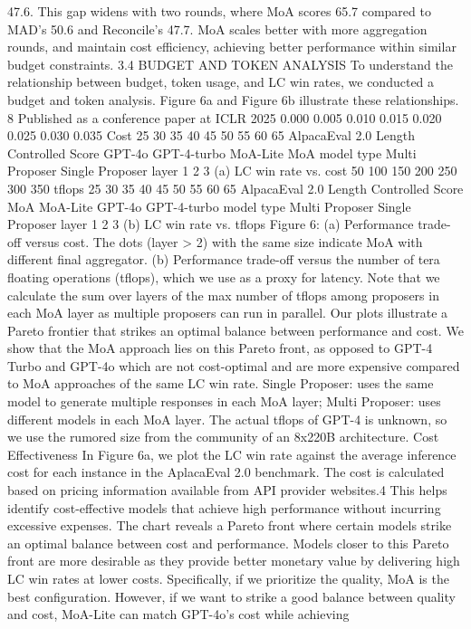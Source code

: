47.6. This gap widens with two rounds, where MoA scores 65.7 compared to MAD’s 50.6 and
Reconcile’s 47.7. MoA scales better with more aggregation rounds, and maintain cost efficiency,
achieving better performance within similar budget constraints.
3.4
BUDGET AND TOKEN ANALYSIS
To understand the relationship between budget, token usage, and LC win rates, we conducted a budget
and token analysis. Figure 6a and Figure 6b illustrate these relationships.
8
Published as a conference paper at ICLR 2025
0.000
0.005
0.010
0.015
0.020
0.025
0.030
0.035
Cost
25
30
35
40
45
50
55
60
65
AlpacaEval 2.0 Length Controlled Score
GPT-4o
GPT-4-turbo
MoA-Lite
MoA
model type
Multi Proposer
Single Proposer
layer
1
2
3
(a) LC win rate vs. cost
50
100
150
200
250
300
350
tflops
25
30
35
40
45
50
55
60
65
AlpacaEval 2.0 Length Controlled Score
MoA
MoA-Lite
GPT-4o
GPT-4-turbo
model type
Multi Proposer
Single Proposer
layer
1
2
3
(b) LC win rate vs. tflops
Figure 6: (a) Performance trade-off versus cost. The dots (layer > 2) with the same size indicate
MoA with different final aggregator. (b) Performance trade-off versus the number of tera floating
operations (tflops), which we use as a proxy for latency. Note that we calculate the sum over layers
of the max number of tflops among proposers in each MoA layer as multiple proposers can run in
parallel. Our plots illustrate a Pareto frontier that strikes an optimal balance between performance
and cost. We show that the MoA approach lies on this Pareto front, as opposed to GPT-4 Turbo and
GPT-4o which are not cost-optimal and are more expensive compared to MoA approaches of the
same LC win rate. Single Proposer: uses the same model to generate multiple responses in each
MoA layer; Multi Proposer: uses different models in each MoA layer. The actual tflops of GPT-4 is
unknown, so we use the rumored size from the community of an 8x220B architecture.
Cost Effectiveness
In Figure 6a, we plot the LC win rate against the average inference cost for
each instance in the AplacaEval 2.0 benchmark. The cost is calculated based on pricing information
available from API provider websites.4 This helps identify cost-effective models that achieve high
performance without incurring excessive expenses. The chart reveals a Pareto front where certain
models strike an optimal balance between cost and performance. Models closer to this Pareto front
are more desirable as they provide better monetary value by delivering high LC win rates at lower
costs. Specifically, if we prioritize the quality, MoA is the best configuration. However, if we want to
strike a good balance between quality and cost, MoA-Lite can match GPT-4o’s cost while achieving
